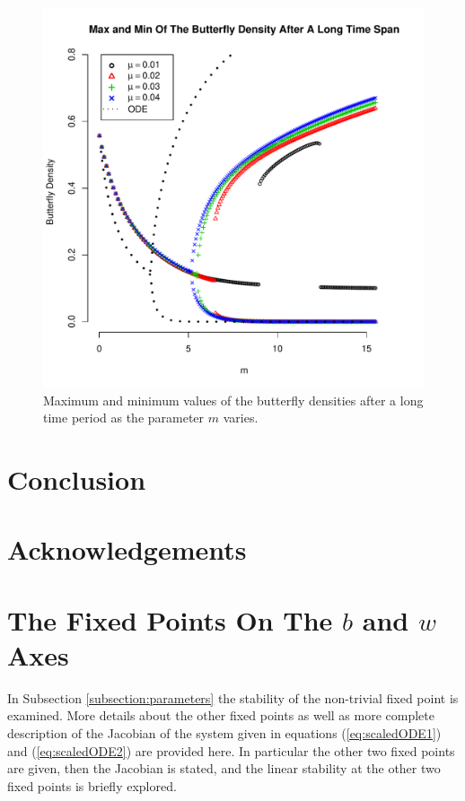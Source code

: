 \documentclass[12pt]{article}
\begin{document}
\begin{figure}[htb]
  \centering
  \includegraphics[width=12cm]{img/maxMinByM-mu-01-04.pdf}
  \caption[Maximum and minimum values of the butterfly
  density]{Maximum and minimum values of the butterfly densities after
    a long time period as the parameter $m$ varies.}
  \label{fig:maxMinButterflySmallMu}
\end{figure}

\section{Conclusion}

\section{Acknowledgements}

\clearpage

\appendix

\section{The Fixed Points On The $b$ and $w$ Axes}
\label{appendix:otherFixedPoints}

In Subsection \ref{subsection:parameters} the stability of the
non-trivial fixed point is examined. More details about the other
fixed points as well as more complete description of the Jacobian of
the system given in equations (\ref{eq:scaledODE1}) and
(\ref{eq:scaledODE2}) are provided here. In particular the other two
fixed points are given, then the Jacobian is stated, and the linear
stability at the other two fixed points is briefly explored.
\end{document}

